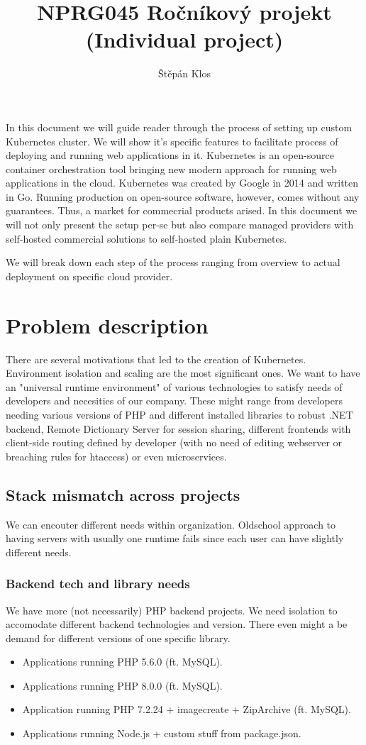 \documentclass{article}
\title{NPRG045 Ročníkový projekt (Individual project)}
\author{Štěpán Klos}
\date{}
\begin{document}
\maketitle

In this document we will guide reader through the process of setting up custom Kubernetes cluster. We will show it's specific features to facilitate process of deploying and running web applications in it.
\bigbreak
Kubernetes is an open-source container orchestration tool bringing new modern approach for running web applications in the cloud. Kubernetes was created by Google in 2014 and written in Go. Running production on open-source software, however, comes without any guarantees. Thus, a market for commecrial products arised. In this document we will not only present the setup per-se but also compare managed providers with self-hosted commercial solutions to self-hosted plain Kubernetes. \par
\bigbreak
We will break down each step of the process ranging from overview to actual deployment on specific cloud provider.   

\section{Problem description}
There are several motivations that led to the creation of Kubernetes. Environment isolation and scaling are the most significant ones. We want to have an "universal runtime environment" of various technologies to satisfy needs of developers and necesities of our company. These might range from developers needing various versions of PHP and different installed libraries to robust .NET backend, Remote Dictionary Server for session sharing, different frontends with client-side routing defined by developer (with no need of editing webserver or breaching rules for htaccess) or even microservices. 
\subsection{Stack mismatch across projects}
We can encouter different needs within organization. Oldschool approach to having servers with usually one runtime fails since each user can have slightly different needs.
\subsubsection{Backend tech and library needs}
We have more (not necessarily) PHP backend projects. We need isolation to accomodate different backend technologies and version. There even might a be demand for different versions of one specific library.
\begin{itemize}
  \item Applications running PHP 5.6.0 (ft. MySQL).
  \item Applications running PHP 8.0.0 (ft. MySQL).
  \item Application running PHP 7.2.24 + imagecreate + ZipArchive (ft. MySQL).
  \item Applications running Node.js + custom stuff from package.json.
\end{itemize}
\end{document}
